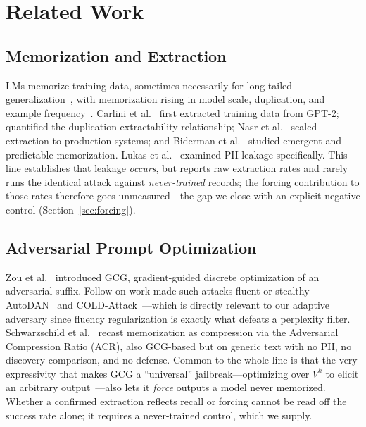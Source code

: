 \documentclass[letterpaper,twocolumn,10pt]{article}
\begin{document}
\section{Related Work}
\label{sec:related}

\subsection{Memorization and Extraction}
LMs memorize training data, sometimes necessarily for long-tailed
generalization~\cite{feldman2020neural}, with memorization rising in model
scale, duplication, and example
frequency~\cite{tirumala2022memorization, carlini2022quantifying}.
Carlini et al.~\cite{carlini2021extracting} first extracted training data from
GPT-2; \cite{carlini2023quantifying} quantified the duplication-extractability
relationship; Nasr et al.~\cite{nasr2023scalable} scaled extraction to
production systems; and Biderman et al.~\cite{biderman2023emergent} studied
emergent and predictable memorization. Lukas et
al.~\cite{lukas2023analyzing} examined PII leakage specifically. This line
establishes that leakage \emph{occurs}, but reports raw extraction rates and
rarely runs the identical attack against \emph{never-trained} records; the
forcing contribution to those rates therefore goes unmeasured---the gap we
close with an explicit negative control (Section~\ref{sec:forcing}).

\subsection{Adversarial Prompt Optimization}
Zou et al.~\cite{zou2023universal} introduced GCG, gradient-guided discrete
optimization of an adversarial suffix. Follow-on work made such attacks fluent
or stealthy---AutoDAN~\cite{liu2023autodan} and
COLD-Attack~\cite{guo2024cold}---which is directly relevant to our adaptive
adversary since fluency regularization is exactly what defeats a perplexity
filter. Schwarzschild et al.~\cite{schwarzschild2024rethinking} recast
memorization as compression via the Adversarial Compression Ratio (ACR), also
GCG-based but on generic text with no PII, no discovery comparison, and no
defense. Common to the whole line is that the very expressivity that makes GCG a
``universal'' jailbreak---optimizing over $V^k$ to elicit an arbitrary
output~\cite{zou2023universal}---also lets it \emph{force} outputs a model never
memorized. Whether a confirmed extraction reflects recall or forcing cannot be
read off the success rate alone; it requires a never-trained control, which we
supply.
\end{document}
